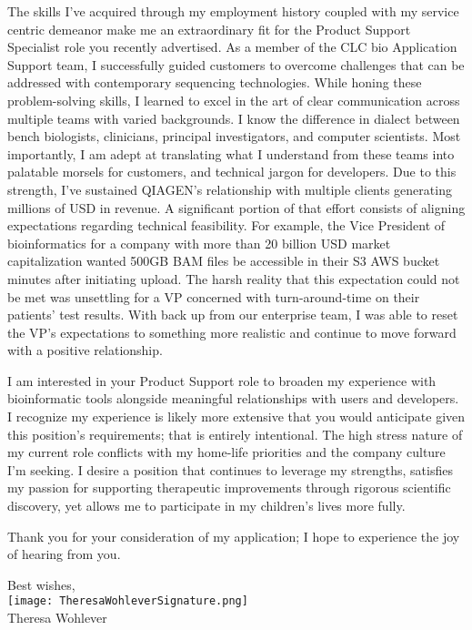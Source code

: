 \documentclass[10pt,letterpaper]{article}
\begin{document}
The skills I've acquired through my employment history coupled with my service centric demeanor make me an extraordinary fit for the Product Support Specialist role you recently advertised. As a member of the CLC bio Application Support team, I successfully guided customers to overcome challenges that can be addressed with contemporary sequencing technologies. While honing these problem-solving skills, I learned to excel in the art of clear communication across multiple teams with varied backgrounds. I know the difference in dialect between bench biologists, clinicians, principal investigators, and computer scientists. Most importantly, I am adept at translating what I understand from these teams into palatable morsels for customers, and technical jargon for developers. Due to this strength, I've sustained QIAGEN's relationship with multiple clients generating millions of USD in revenue. A significant portion of that effort consists of aligning expectations regarding technical feasibility. For example, the Vice President of bioinformatics for a company with more than 20 billion USD market capitalization wanted 500GB BAM files be accessible in their S3 AWS bucket minutes after initiating upload. The harsh reality that this expectation could not be met was unsettling for a VP concerned with turn-around-time on their patients' test results. With back up from our enterprise team, I was able to reset the VP's expectations to something more realistic and continue to move forward with a positive relationship.

I am interested in your Product Support role to broaden my experience with bioinformatic tools alongside meaningful relationships with users and developers. I recognize my experience is likely more extensive that you would anticipate given this position's requirements; that is entirely intentional. The high stress nature of my current role conflicts with my home-life priorities and the company culture I'm seeking. I desire a position that continues to leverage my strengths, satisfies my passion for supporting therapeutic improvements through rigorous scientific discovery, yet allows me to participate in my children’s lives more fully.

Thank you for your consideration of my application; I hope to experience the joy of hearing from you.




\hspace*{.6\linewidth} Best wishes, \\
\hspace*{.57\linewidth} \texttt{[image: TheresaWohleverSignature.png]}  {\vspace{-9pt}} \\
\hspace*{.6\linewidth}  Theresa Wohlever
\end{document}
